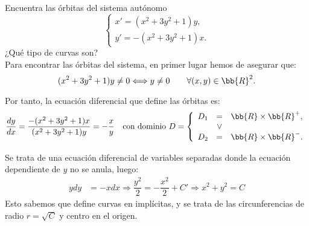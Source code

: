 \documentclass[12pt]{article}
\begin{document}
    \begin{ejercicio}
        Encuentra las órbitas del sistema autónomo
        \begin{equation*}
            \begin{cases}
                x' = (x^2 + 3y^2 + 1)y,\\
                y' = -(x^2 + 3y^2 + 1)x.
            \end{cases}
        \end{equation*}
        ¿Qué tipo de curvas son?\\

        Para encontrar las órbitas del sistema, en primer lugar hemos de asegurar que:
        \begin{equation*}
            (x^2 + 3y^2 + 1)y \neq 0 \Longleftrightarrow
            y\neq 0 \qquad \forall (x, y) \in \bb{R}^2.
        \end{equation*}

        Por tanto, la ecuación diferencial que define las órbitas es:
        \begin{equation*}
            \dfrac{dy}{dx} = \dfrac{-(x^2 + 3y^2 + 1)x}{(x^2 + 3y^2 + 1)y} = -\dfrac{x}{y} \quad \text{con dominio } D = \left\{
                \begin{array}{rcl}
                    D_1 &=& \bb{R}\times \bb{R}^+,\\
                    &\lor& \\
                    D_2 &=& \bb{R}\times \bb{R}^-.
                \end{array}
            \right.
        \end{equation*}

        Se trata de una ecuación diferencial de variables separadas donde la ecuación dependiente de $y$ no se anula, luego:
        \begin{align*}
            ydy &= -xdx \Longrightarrow \dfrac{y^2}{2} = -\dfrac{x^2}{2} + C'
            \Longrightarrow x^2 + y^2 =C
        \end{align*}
        Esto sabemos que define curvas en implícitas, y se trata de las circunferencias de radio $r=\sqrt{C}$ y centro en el origen.
    \end{ejercicio}
\end{document}
